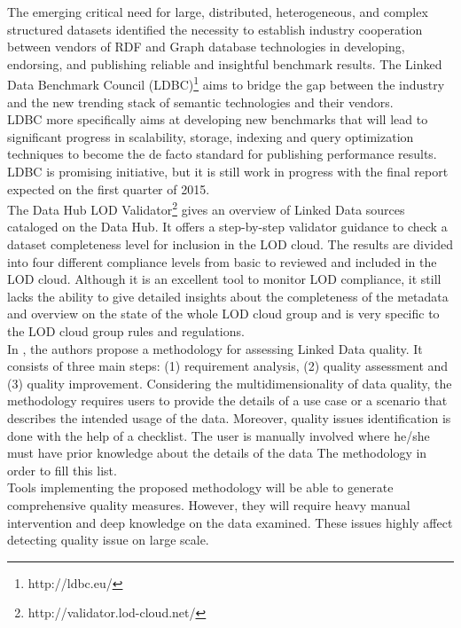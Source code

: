 \documentclass[onecolumn, crcready]{iosart2c}
\begin{document}
The emerging critical need for large, distributed, heterogeneous, and complex structured datasets identified the necessity to establish industry cooperation between vendors of RDF and Graph database technologies in developing, endorsing, and publishing reliable and insightful benchmark results. The Linked Data Benchmark Council (LDBC)\footnote{http://ldbc.eu/} aims to bridge the gap between the industry and the new trending stack of semantic technologies and their vendors. \\ LDBC more specifically aims at developing new benchmarks that will lead to significant progress in scalability, storage, indexing and query optimization techniques to become the de facto standard for publishing performance results. LDBC is promising initiative, but it is still work in progress with the final report expected on the first quarter of 2015.\\

The Data Hub LOD Validator\footnote{http://validator.lod-cloud.net/} gives an overview of Linked Data sources cataloged on the Data Hub. It offers a step-by-step validator guidance to check a dataset completeness level for inclusion in the LOD cloud. The results are divided into four different compliance levels from basic to reviewed and included in the LOD cloud. Although it is an excellent tool to monitor LOD compliance, it still lacks the ability to give detailed insights about the completeness of the metadata and overview on the state of the whole LOD cloud group and is very specific to the LOD cloud group rules and regulations.\\

In \cite{DBLP:conf/i-semantics/RulaZ14}, the authors propose a methodology for assessing Linked Data quality. It consists of three main steps: (1) requirement analysis, (2) quality assessment and (3) quality improvement. Considering the multidimensionality of data quality, the methodology requires users to provide the details of a use case or a scenario that describes the intended usage of the data. Moreover, quality issues identification is done with the help of a checklist. The user is manually involved where he/she must have prior knowledge about the details of the data The methodology in order to fill this list.\\
Tools implementing the proposed methodology will be able to generate comprehensive quality measures. However, they will require heavy manual intervention and deep knowledge on the data examined. These issues highly affect detecting quality issue on large scale.\\
\end{document}
